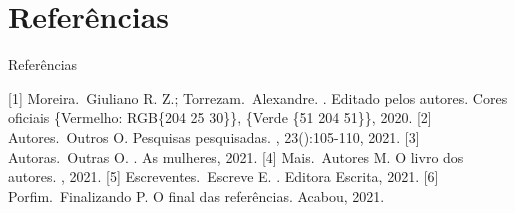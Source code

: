\documentclass[a4paper]{beamer}
\begin{document}
\section{Referências}
\begin{frame}[allowframebreaks]{Referências}
    \begin{thebibliography}{}
         [1] Moreira.~Giuliano R. Z.; Torrezam.~Alexandre.
            .
            \newblock Editado pelos autores. Cores oficiais \{Vermelho: RGB\{204 25 30\}\}, \{Verde \{51 204 51\}\}, 2020.
         [2] Autores.~Outros O.
            \newblock Pesquisas pesquisadas.
            , 23():105-110, 2021.
         [3] Autoras.~Outras O.
            .
            \newblock As mulheres, 2021.
         [4] Mais.~Autores M.
            \newblock O livro dos autores.
            , 2021.
         [5] Escreventes.~Escreve E.
            .
            \newblock Editora Escrita, 2021.
         [6] Porfim.~Finalizando P.
            \newblock O final das referências.
            \newblock Acabou, 2021.
    \end{thebibliography}
\end{frame}
\end{document}
